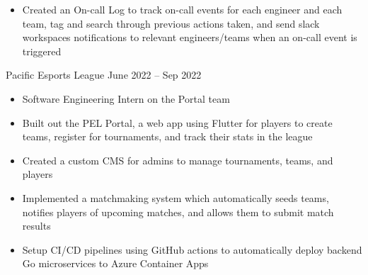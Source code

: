 \documentclass[9pt]{developercv} %
\begin{document}
\begin{entrylist}
{\begin{itemize}[noitemsep,topsep=0pt,parsep=0pt,partopsep=0pt, leftmargin=10pt]
            \item Created an On-call Log to track on-call events for each engineer and each team, tag and search through previous actions taken, and send slack workspaces notifications to relevant engineers/teams when an on-call event is triggered
        \end{itemize}}
	\entry
		{}
		{Pacific Esports League}
		{June 2022 – Sep 2022}
		{\vspace{-10pt}
        \begin{itemize}[noitemsep,topsep=0pt,parsep=0pt,partopsep=0pt, leftmargin=10pt]
            \item Software Engineering Intern on the Portal team
            \item Built out the PEL Portal, a web app using Flutter for players to create teams, register for tournaments, and track their stats in the league
            \item Created a custom CMS for admins to manage tournaments, teams, and players
            \item Implemented a matchmaking system which automatically seeds teams, notifies players of upcoming matches, and allows them to submit match results
            \item Setup CI/CD pipelines using GitHub actions to automatically deploy backend Go microservices to Azure Container Apps
        \end{itemize}}
\end{entrylist}
\end{document}
